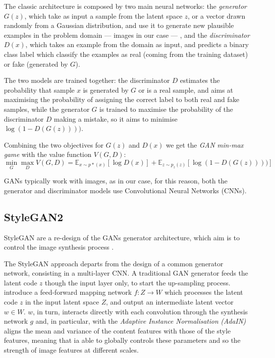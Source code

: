 \documentclass{article}
\begin{document}
	The classic architecture is composed by two main neural networks: the \textit{generator} ${G(z)}$, 
	which take as input a sample from the latent space $z$, or a vector drawn randomly from a 
	Gaussian distribution, and use it to generate new plausible examples in the problem domain — 
	images in our case — , and the \textit{discriminator} ${D(x)}$, which takes an example from the 
	domain as input, and predicts a binary class label which classify the examples as real (coming from 
	the training dataset) or fake (generated by $G$).
	
	The two models are trained together: the discriminator $D$ estimates the probability that 
	sample $x$ is generated by $G$ or is a real sample, and aims at maximising the probability of 
	assigning the correct label to both real and fake samples, while the generator $G$ is trained to 
	maximise the probability of the discriminator $D$ making a mistake, so it aims to minimise 
	$\log(1-D(G(z))))$.

	Combining the two objectives for $G(z)$ and $D(x)$ we get the \textit{GAN min-max game} with the 
	value function $V(G,D)$:
	\begin{equation}
	\label{e:minmaxgame}
	\min_G \max_D V(G,D) = 
	\mathbb{E}_{x \sim p*(x)} [\log D(x)] + \mathbb E _{z \sim p_z(z)} [\log (1-D(G(z))))]
	\end{equation}
	
	GANs typically work with images, as in our case, for this reason, both the generator and 
	discriminator models use Convolutional Neural Networks (CNNs).
	
	\subsection{StyleGAN2}\label{sec:stylegan}%
	StyleGAN are a re-design of the GANs generator architecture, which aim is to control the image 
	synthesis process \cite{karras2019style}.
	
	The StyleGAN approach departs from the design of a common generator network, consisting in a 
	multi-layer CNN.
	A traditional GAN generator feeds the latent code $z$ though the input layer only, to start the 
	up-sampling process.
	\citet{karras2019style} introduce a feed-forward mapping network $f : Z \rightarrow W$ which 
	processes the latent code $z$ in the input latent space $Z$, and output an intermediate latent 
	vector $w \in W$. 
	$w$, in turn, interacts directly with each convolution through the synthesis network  $g$ and, in 
	particular, with the \textit{Adaptive Instance Normalisation (AdaIN)} \cite{huang2017arbitrary} aligns 
	the mean and variance of the content features with those of the style features, meaning that ia able 
	to globally controls these parameters and so the strength of image features at different scales. 
	
\end{document}
